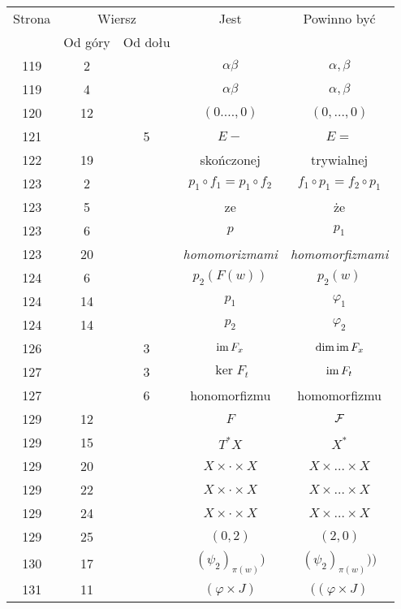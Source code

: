 \documentclass[a4paper,11pt]{article}
\begin{document}
\begin{center}
  \begin{tabular}{|c|c|c|c|c|}
    \hline
    Strona & \multicolumn{2}{c|}{Wiersz} & Jest
                              & Powinno być \\ \cline{2-3}
    & Od góry & Od dołu & & \\
    \hline
    119 & \hphantom{0}2 & & $\alpha\beta$ & $\alpha, \beta$ \\
    119 & \hphantom{0}4 & & $\alpha\beta$ & $\alpha, \beta$ \\
    120 & 12 & & $( 0. \ldots, 0 )$ & $( 0, \ldots, 0 )$ \\
    121 & & \hphantom{0}5 & $E -$ & $E =$ \\
    122 & 19 & & skończonej & trywialnej \\
    123 & \hphantom{0}2 & & $p_{ 1 } \circ f_{ 1 } = p_{ 1 } \circ f_{ 2 }$
           & $f_{ 1 } \circ p_{ 1 } = f_{ 2 } \circ p_{ 1 }$ \\
    123 & \hphantom{0}5 & & ze & że \\
    123 & \hphantom{0}6 & & $p$ & $p_{ 1 }$ \\
    123 & 20 & & \textit{homomorizmami} & \textit{homomorfizmami} \\
    124 & \hphantom{0}6 & & $p_{ 2 }( F( w ) )$ & $p_{ 2 }( w )$ \\
    124 & 14 & & $p_{ 1 }$ & $\varphi_{ 1 }$ \\
    124 & 14 & & $p_{ 2 }$ & $\varphi_{ 2 }$ \\
    126 & & \hphantom{0}3 & $\mathrm{im} \, F_{ x }$ & $\dim\mathrm{im} \, F_{ x }$ \\
    127 & & \hphantom{0}3 & $\ker F_{ t }$ & $\mathrm{im} \, F_{ t }$ \\
    127 & & \hphantom{0}6 & honomorfizmu & homomorfizmu \\
    129 & 12 & & $F$ & $\mathcal{F}$ \\
    129 & 15 & & $T^{ * }X$ & $X^{ * }$ \\
    129 & 20 & & $X \times \cdot \times X$ & $X \times \ldots \times X$ \\
    129 & 22 & & $X \times \cdot \times X$ & $X \times \ldots \times X$ \\
    129 & 24 & & $X \times \cdot \times X$ & $X \times \ldots \times X$ \\
    129 & 25 & & $( 0, 2 )$ & $( 2, 0 )$ \\
    130 & 17 & & $( \psi_{ 2 } )_{ \pi( w ) } )$
           & $( \psi_{ 2 } )_{ \pi( w ) } ) \big)$ \\
    131 & 11 & & $( \varphi \times J )$ & $( ( \varphi \times J )$ \\

\end{tabular}
\end{center}
\end{document}
